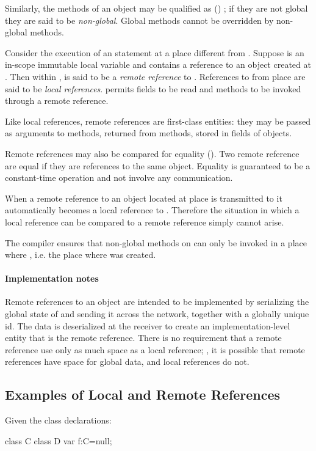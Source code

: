Similarly, the methods of an object may be qualified as
() ; if they are not global they are
said to be \emph{non-global}. 
Global methods cannot be overridden by non-global methods.

Consider the execution of an  statement at a place
 different from . Suppose  is an in-scope
immutable local variable and contains a reference to an object 
created at . Then within ,  is said to be a
\emph{remote reference} to . References to  from place
 are said to be \emph{local references}. \Xten{} permits
 fields to be read and  methods to be invoked
through a remote reference.

Like local references, remote references are first-class entities:
they may be passed as arguments to methods, returned from methods,
stored in fields of objects.

Remote references may also be compared for equality (\Xcd{==}). Two
remote reference are equal if they are references to the same
object. Equality is guaranteed to be a constant-time operation and not
involve any communication.

When a remote reference to an object  located at place  is
transmitted to  it automatically becomes a local reference to
. Therefore the situation in which a local reference can be compared
to a remote reference simply cannot arise.

The \Xten{} compiler ensures that non-global methods on  can
only be invoked in a place where , i.e. the place
where  was created.

\paragraph{Implementation notes}
Remote references to an object  are intended to be implemented by
serializing the global state of  and sending it across the network,
together with a globally unique id. The data is deserialized at the receiver
to create an implementation-level entity that is the remote reference.
There is no requirement that a remote reference use only as much space as a
local reference; \eg, it is possible that remote references have space for
global data, and local references do not.

  

  
\subsection{Examples of Local and Remote References}
Given the class declarations: 
\begin{xten}
class C { } 
class D {
   var f:C=null;
}
\end{xten}

